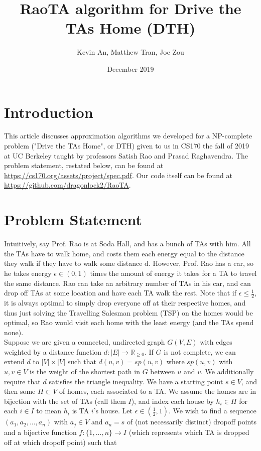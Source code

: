 \documentclass{article}
\title{RaoTA algorithm for Drive the TAs Home (DTH)}
\author{Kevin An, Matthew Tran, Joe Zou}
\date{December 2019}
\theoremstyle{definition}
\theoremstyle{remark}
\begin{document}
\maketitle
\pagebreak
\section{Introduction}
    This article discusses approximation algorithms we developed for a NP-complete problem ("Drive the TAs Home", or DTH) given to us in CS170 the fall of 2019 at UC Berkeley taught by professors Satish Rao and Prasad Raghavendra. The problem statement, restated below, can be found at \url{https://cs170.org/assets/project/spec.pdf}. Our code itself can be found at \url{https://github.com/dragonlock2/RaoTA}.
    
\section{Problem Statement}
    	Intuitively, say Prof. Rao is at Soda Hall, and has a bunch of TAs with him. All the TAs have to walk home, and costs them each energy equal to the distance they walk if they have to walk some distance d. However, Prof. Rao has a car, so he takes energy $\epsilon \in (0, 1)$ times the amount of energy it takes for a TA to travel the same distance. Rao can take an arbitrary number of TAs in his car, and can drop off TAs at some location and have each TA walk the rest. Note that if $\epsilon \leq \frac{1}{2}$, it is always optimal to simply drop everyone off at their respective homes, and thus just solving the Travelling Salesman problem (TSP) on the homes would be optimal, so Rao would visit each home with the least energy (and the TAs spend none). 
        \\
        
        Suppose we are given a connected, undirected graph $G(V, E)$ with edges weighted by a distance function $d: |E| \xrightarrow{} \mathbb{R}_{\geq 0}$. If $G$ is not complete, we can extend $d$ to $|V| \times |V|$ such that $d(u, v) = sp(u, v)$ where $sp(u, v)$ with $u, v \in V$ is the weight of the shortest path in $G$ between $u$ and $v$.  We additionally require that $d$ satisfies the triangle inequality. We have a starting point $s \in V$, and then some $H \subset V$ of homes, each associated to a TA.  We assume the homes are in bijection with the set of TAs (call them $I$), and index each house by $h_i \in H$ for each $i \in I$ to mean $h_i$ is TA $i$'s house. Let $\epsilon \in (\frac{1}{2}, 1)$. We wish to find a sequence $(a_1, a_2, ..., a_n)$ with $a_j \in V$ and $a_n = s$ of (not necessarily distinct) dropoff points and a bijective function $f: \{1, ..., n\} \rightarrow I$ (which represents which TA is dropped off at which dropoff point) such that
        
\end{document}
